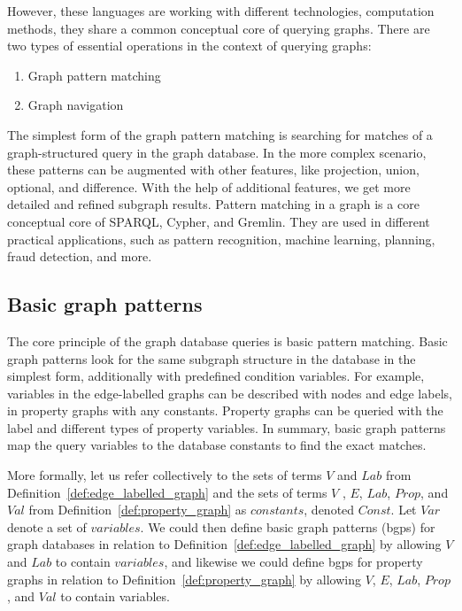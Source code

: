 However, these languages are working with different technologies, computation methods, they share a common conceptual core of querying graphs.
There are two types of essential operations in the context of querying graphs:

\begin{enumerate}
  \item Graph pattern matching
  \item Graph navigation
\end{enumerate}

The simplest form of the graph pattern matching is searching for matches of a graph-structured query in the graph database.
In the more complex scenario, these patterns can be augmented with other features, like projection, union, optional, and difference.
With the help of additional features, we get more detailed and refined subgraph results.
Pattern matching in a graph is a core conceptual core of SPARQL, Cypher, and Gremlin.
They are used in different practical applications, such as pattern recognition, machine learning, planning, fraud detection, and more.

\subsection{Basic graph patterns}

The core principle of the graph database queries is basic pattern matching.
Basic graph patterns look for the same subgraph structure in the database in the simplest form, additionally with predefined condition variables.
For example, variables in the edge-labelled graphs can be described with nodes and edge labels, in property graphs with any constants.
Property graphs can be queried with the label and different types of property variables. 
In summary, basic graph patterns map the query variables to the database constants to find the exact matches.

\begin{definition}\label{def:basic_graph_patterns}\cite{DBLP:journals/csur/AnglesABHRV17}
More formally, let us refer collectively to the sets of terms $V$ and $\textit{Lab}$ from Definition~\ref{def:edge_labelled_graph} and the sets of terms $V$ , $E$, $\textit{Lab}$, $\textit{Prop}$, and $\textit{Val}$ from Definition~\ref{def:property_graph} as $\textit{constants}$, 
denoted $\textit{Const}$. Let $Var$ denote a set of $\textit{variables}$. We could then define basic graph patterns (bgps) for graph databases in relation
to Definition~\ref{def:edge_labelled_graph} by allowing $V$ and $\textit{Lab}$ to contain $\textit{variables}$, and likewise we could define bgps for
property graphs in relation to Definition~\ref{def:property_graph} by allowing $V$, $E$, $\textit{Lab}$, $\textit{Prop}$, and $\textit{Val}$ to contain variables.
\end{definition}

